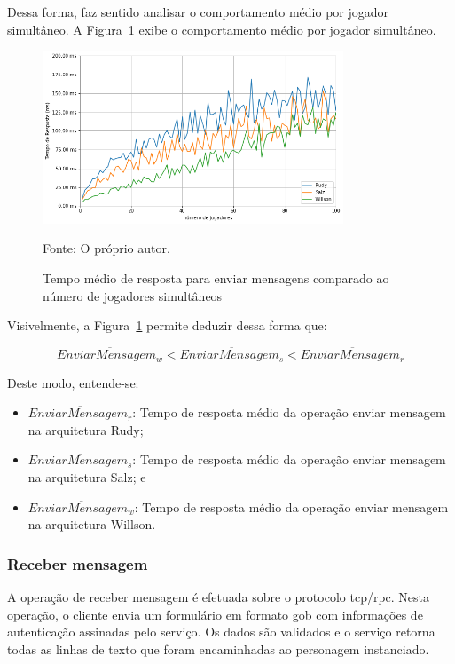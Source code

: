 %
Dessa forma, faz sentido analisar o comportamento médio por jogador simultâneo.
%
A Figura~\ref{fig:send_chat_request_time_per_concurrency} exibe o comportamento médio por jogador simultâneo.
\pagebreak

\begin{figure}[htb!]
  \caption{Tempo médio de resposta para enviar mensagens comparado ao número de jogadores simultâneos}
  \label{fig:send_chat_request_time_per_concurrency}
  \includegraphics[width=0.8\textwidth]{figuras/analise/rt/send_chat_request_time_per_concurrency}
  \centering

  Fonte: O próprio autor.
\end{figure}

Visivelmente, a Figura~\ref{fig:send_chat_request_time_per_concurrency} permite deduzir dessa forma que:

$$
  \overline{EnviarMensagem_{w}} < \overline{EnviarMensagem_{s}} <\overline{EnviarMensagem_{r}}
$$

Deste modo, entende-se:

\begin{itemize}
 \item $\overline{EnviarMensagem_{r}}$: Tempo de resposta médio da operação enviar mensagem na arquitetura Rudy;
 \item $\overline{EnviarMensagem_{s}}$: Tempo de resposta médio da operação enviar mensagem na arquitetura Salz; e
 \item $\overline{EnviarMensagem_{w}}$: Tempo de resposta médio da operação enviar mensagem na arquitetura Willson.
\end{itemize}

\subsubsection{Receber mensagem}

A operação de receber mensagem é efetuada sobre o protocolo \ac{tcp}/\ac{rpc}.
%
Nesta operação, o cliente envia um formulário em formato \ac{gob} com informações de autenticação assinadas pelo serviço.
%
Os dados são validados e o serviço retorna todas as linhas de texto que foram encaminhadas ao personagem instanciado.

